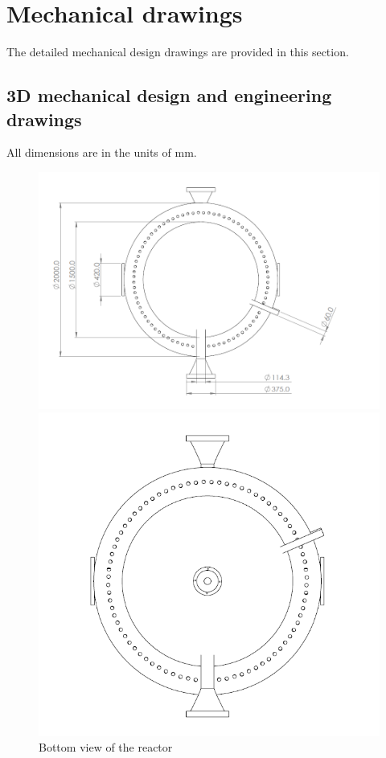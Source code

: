 \section{Mechanical drawings}
\label{app:reactor-drawings}

The detailed mechanical design drawings are provided in this section.

\subsection{3D mechanical design and engineering drawings}
\label{app:engineeringdesign}
All dimensions are in the units of mm.
\begin{figure}[h]
    \begin{minipage}[t]{0.6\linewidth}
        \includegraphics[width=\linewidth]{chapters/2-reaction/figures/FYD reactor bottom view with calc.PNG}
        \caption{Bottom view of the reactor}
        \label{fig:reactorbottom}
    \end{minipage}\hfill
    \begin{minipage}[t]{0.4\linewidth}
        \includegraphics[width=\linewidth]{chapters/2-reaction/figures/FYD reactor top view.PNG}

\end{minipage}
\end{figure}
